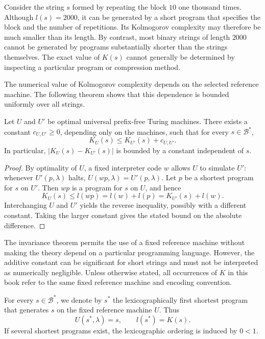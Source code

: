 \begin{example}
Consider the string $s$ formed by repeating the block $10$ one thousand times. Although $l(s)=2000$, it can be generated by a short program that specifies the block and the number of repetitions. Its Kolmogorov complexity may therefore be much smaller than its length. By contrast, most binary strings of length $2000$ cannot be generated by programs substantially shorter than the strings themselves. The exact value of $K(s)$ cannot generally be determined by inspecting a particular program or compression method.
\end{example}

The numerical value of Kolmogorov complexity depends on the selected reference machine. The following theorem shows that this dependence is bounded uniformly over all strings.

\begin{theorem}
\label{def:Invariance-theorem}
Let $U$ and $U'$ be optimal universal prefix-free Turing machines. There exists a constant $c_{U,U'}\geq 0$, depending only on the machines, such that for every $s\in\mathcal{B}^*$,
\[
K_U(s)\leq K_{U'}(s)+c_{U,U'}.
\]
In particular, $|K_U(s)-K_{U'}(s)|$ is bounded by a constant independent of $s$.
\end{theorem}
\begin{proof}
By optimality of $U$, a fixed interpreter code $w$ allows $U$ to simulate $U'$: whenever $U'(p,\lambda)$ halts, $U(wp,\lambda)=U'(p,\lambda)$. Let $p$ be a shortest program for $s$ on $U'$. Then $wp$ is a program for $s$ on $U$, and hence
\[
K_U(s)\leq l(wp)=l(w)+l(p)=K_{U'}(s)+l(w).
\]
Interchanging $U$ and $U'$ yields the reverse inequality, possibly with a different constant. Taking the larger constant gives the stated bound on the absolute difference.
\end{proof}

The invariance theorem permits the use of a fixed reference machine without making the theory depend on a particular programming language. However, the additive constant can be significant for short strings and must not be interpreted as numerically negligible. Unless otherwise stated, all occurrences of $K$ in this book refer to the same fixed reference machine and encoding convention.

\begin{notation}
For every $s\in\mathcal{B}^*$, we denote by $s^*$ the lexicographically first shortest program that generates $s$ on the fixed reference machine $U$. Thus
\[
U(s^*,\lambda)=s,
\qquad l(s^*)=K(s).
\]
If several shortest programs exist, the lexicographic ordering is induced by $0<1$.
\end{notation}

